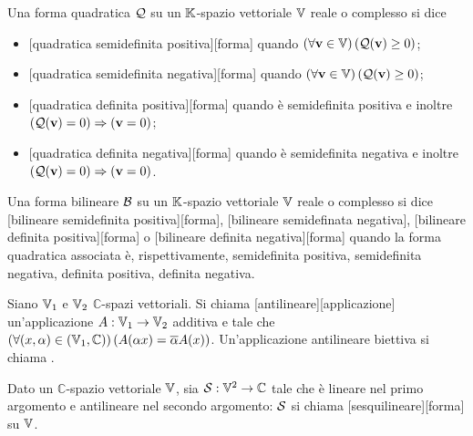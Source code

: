 \begin{Definition}
	Una forma quadratica $\mathcal{Q}$ su un $\mathbb{K}$-spazio vettoriale $\mathbb{V}$ reale o complesso si dice
	\begin{itemize}
		\item {}[quadratica semidefinita positiva][forma] quando $\left ( \forall \mathbf{v} \in \mathbb{V} \right ) \left ( \mathcal{Q}(\mathbf{v}) \geq 0 \right )$;
		\item {}[quadratica semidefinita negativa][forma] quando $\left ( \forall \mathbf{v} \in \mathbb{V} \right ) \left ( \mathcal{Q}(\mathbf{v}) \geq 0 \right )$;
		\item {}[quadratica definita positiva][forma] quando \`e semidefinita positiva e inoltre $\left ( \mathcal{Q}(\mathbf{v}) = 0 \right ) \Rightarrow \left ( \mathbf{v} = 0 \right )$;
		\item {}[quadratica definita negativa][forma] quando \`e semidefinita negativa e inoltre $\left ( \mathcal{Q}(\mathbf{v}) = 0 \right ) \Rightarrow \left ( \mathbf{v} = 0 \right )$.
	\end{itemize}
	Una forma bilineare $\mathcal{B}$ su un $\mathbb{K}$-spazio vettoriale $\mathbb{V}$ reale o complesso si dice [bilineare semidefinita positiva][forma], [bilineare semidefinata negativa], [bilineare definita positiva][forma] o [bilineare definita negativa][forma] quando la forma quadratica associata \`e, rispettivamente, semidefinita positiva, semidefinita negativa, definita positiva, definita negativa.
\end{Definition}
\begin{Definition}
	Siano $\mathbb{V}_1$ e $\mathbb{V}_2$ $\mathbb{C}$-spazi vettoriali. Si chiama [antilineare][applicazione] un'applicazione $A: \mathbb{V}_1 \rightarrow \mathbb{V}_2$ additiva e tale che $\left ( \forall (x,\alpha) \in (\mathbb{V}_1,\mathbb{C}) \right ) \left ( A(\alpha x) = \overline{\alpha}A(x) \right )$. Un'applicazione antilineare biettiva si chiama .
\end{Definition}
\begin{Definition}
	Dato un $\mathbb{C}$-spazio vettoriale $\mathbb{V}$, sia $\mathcal{S}: \mathbb{V}^2 \rightarrow \mathbb{C}$ tale che \`e lineare nel primo argomento e antilineare nel secondo argomento: $\mathcal{S}$ si chiama [sesquilineare][forma] su $\mathbb{V}$.
\end{Definition}
